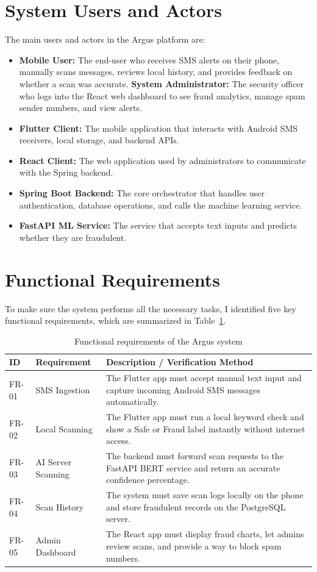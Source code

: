 \section{System Users and Actors}
The main users and actors in the Argus platform are:
\begin{itemize}
  \item \textbf{Mobile User:} The end-user who receives SMS alerts on their phone, manually scans messages, reviews local history, and provides feedback on whether a scan was accurate.
  \textbf{System Administrator:} The security officer who logs into the React web dashboard to see fraud analytics, manage spam sender numbers, and view alerts.
  \item \textbf{Flutter Client:} The mobile application that interacts with Android SMS receivers, local storage, and backend APIs.
  \item \textbf{React Client:} The web application used by administrators to communicate with the Spring backend.
  \item \textbf{Spring Boot Backend:} The core orchestrator that handles user authentication, database operations, and calls the machine learning service.
  \item \textbf{FastAPI ML Service:} The service that accepts text inputs and predicts whether they are fraudulent.
\end{itemize}

\section{Functional Requirements}
To make sure the system performs all the necessary tasks, I identified five key functional requirements, which are summarized in Table~\ref{tab:functional-requirements}.

\begin{table}[htbp]
  \centering
  \caption{Functional requirements of the Argus system}
  \label{tab:functional-requirements}
  \begin{tabularx}{\textwidth}{l p{} X}
    \toprule
    \textbf{ID} & \textbf{Requirement} & \textbf{Description / Verification Method}\\
    \midrule
    FR-01 & SMS Ingestion & The Flutter app must accept manual text input and capture incoming Android SMS messages automatically.\\
    FR-02 & Local Scanning & The Flutter app must run a local keyword check and show a Safe or Fraud label instantly without internet access.\\
    FR-03 & AI Server Scanning & The backend must forward scan requests to the FastAPI BERT service and return an accurate confidence percentage.\\
    FR-04 & Scan History & The system must save scan logs locally on the phone and store fraudulent records on the PostgreSQL server.\\
    FR-05 & Admin Dashboard & The React app must display fraud charts, let admins review scans, and provide a way to block spam numbers.\\
    \bottomrule
  \end{tabularx}
\end{table}

